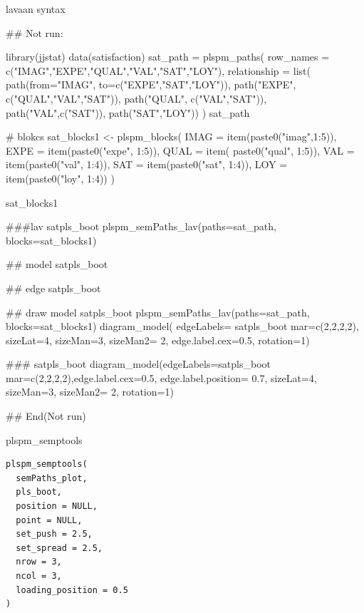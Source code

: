 \documentclass[a4paper]{book}
\begin{document}
%
\begin{Value}
lavaan syntax
\end{Value}
%
\begin{Examples}
\begin{ExampleCode}

## Not run: 

library(jjstat)
data(satisfaction)
sat_path = plspm_paths(
  row_names = c("IMAG","EXPE","QUAL","VAL","SAT","LOY"),
  relationship = list(
    path(from="IMAG", to=c("EXPE","SAT","LOY")),
    path("EXPE", c("QUAL","VAL","SAT")),
    path("QUAL", c("VAL","SAT")),
    path("VAL",c("SAT")),
    path("SAT","LOY"))
)
sat_path

# blokcs
sat_blocks1 <- plspm_blocks(
  IMAG = item(paste0("imag",1:5)),
  EXPE = item(paste0("expe", 1:5)),
  QUAL = item( paste0("qual", 1:5)),
  VAL = item(paste0("val", 1:4)),
  SAT = item(paste0("sat", 1:4)),
  LOY = item(paste0("loy", 1:4))
)

sat_blocks1


###lav
satpls_boot%
  plspm_semPaths_lav(paths=sat_path, blocks=sat_blocks1)%

## model
satpls_boot%

## edge
satpls_boot%

## draw model
satpls_boot%
  plspm_semPaths_lav(paths=sat_path, blocks=sat_blocks1)%
  diagram_model(  edgeLabels= satpls_boot%
                  mar=c(2,2,2,2),
                  sizeLat=4, sizeMan=3, sizeMan2= 2, edge.label.cex=0.5, rotation=1)

###
satpls_boot%
  diagram_model(edgeLabels=satpls_boot%
                mar=c(2,2,2,2),edge.label.cex=0.5, edge.label.position= 0.7,
                sizeLat=4, sizeMan=3, sizeMan2= 2, rotation=1)


## End(Not run)


\end{ExampleCode}
\end{Examples}
%
\begin{Description}
plspm\_semptools
\end{Description}
%
\begin{Usage}
\begin{verbatim}
plspm_semptools(
  semPaths_plot,
  pls_boot,
  position = NULL,
  point = NULL,
  set_push = 2.5,
  set_spread = 2.5,
  nrow = 3,
  ncol = 3,
  loading_position = 0.5
)
\end{verbatim}
\end{Usage}
\end{document}
